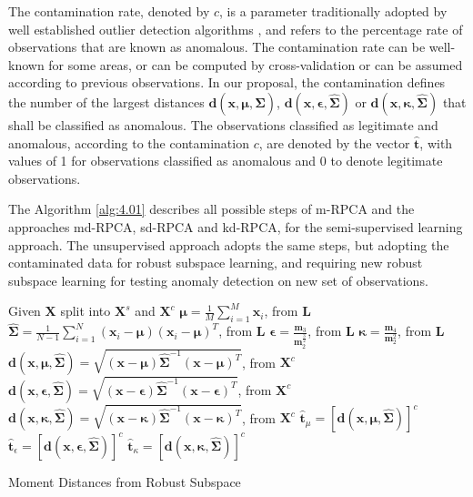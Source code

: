 The contamination rate, denoted by $c$, is a parameter traditionally adopted by well established outlier detection algorithms \cite{zhao2019pyod}, and refers to the percentage rate of observations that are known as anomalous. The contamination rate can be well-known for some areas, or can be computed by cross-validation \cite{arlot2010survey} or can be assumed according to previous observations. In our proposal, the contamination defines the number of the largest distances $\pmb{d}(\pmb{x}, \pmb{\mu}, \hat{\pmb{\Sigma}})$, $\pmb{d}(\pmb{x}, \pmb{\epsilon}, \hat{\pmb{\Sigma}})$ or $\pmb{d}(\pmb{x}, \pmb{\kappa}, \hat{\pmb{\Sigma}})$ that shall be classified as anomalous. The observations classified as legitimate and anomalous, according to the contamination $c$, are denoted by the vector $\hat{\pmb{t}}$, with values of 1 for observations classified as anomalous and 0 to denote legitimate observations.

The Algorithm \ref{alg:4.01} describes all possible steps of m-RPCA and the approaches md-RPCA, sd-RPCA and kd-RPCA, for the semi-supervised learning approach. The unsupervised approach adopts the same steps, but adopting the contaminated data for robust subspace learning, and requiring new robust subspace learning for testing anomaly detection on new set of observations.

\begin{algorithm}
	\label{alg:4.01}
	\SetAlgoLined
	Given $\pmb{X}$ split into $\pmb{X}^s$ and $\pmb{X}^c$\;
	$\pmb{\mu} = \displaystyle\frac{1}{M}\displaystyle\sum_{i = 1}^{M} \pmb{x}_i$, from $\pmb{L}$\;
	$\hat{\pmb{\Sigma}} = \displaystyle\frac{1}{N-1}\displaystyle\sum_{i = 1}^{N} (\pmb{x}_i - \pmb{\mu})(\pmb{x}_i - \pmb{\mu})^T$, \rm from $\pmb{L}$\;
	$\pmb{\epsilon} = \frac{\pmb{m}_3}{\pmb{m}_2^{\frac{3}{2}}}$, \rm from $\pmb{L}$\;
	$\pmb{\kappa} = \frac{\pmb{m}_4}{\pmb{m}_2^2}$, \rm from $\pmb{L}$\;
	$\pmb{d}(\pmb{x}, \pmb{\mu}, \hat{\pmb{\Sigma}}) = \sqrt{(\pmb{x} - \pmb{\mu}) \hat{\pmb{\Sigma}}^{-1}(\pmb{x} - \pmb{\mu})^T}$, \rm from $\pmb{X}^c$\;
	$\pmb{d}(\pmb{x}, \pmb{\epsilon}, \hat{\pmb{\Sigma}}) = \sqrt{(\pmb{x} - \pmb{\epsilon}) \hat{\pmb{\Sigma}}^{-1}(\pmb{x} - \pmb{\epsilon})^T}$, \rm from $\pmb{X}^c$\;
	$\pmb{d}(\pmb{x}, \pmb{\kappa}, \hat{\pmb{\Sigma}}) = \sqrt{(\pmb{x} - \pmb{\kappa}) \hat{\pmb{\Sigma}}^{-1}(\pmb{x} - \pmb{\kappa})^T}$, \rm from $\pmb{X}^c$\;
	$\hat{\pmb{t}}_{\mu} = [\pmb{d}(\pmb{x}, \pmb{\mu}, \hat{\pmb{\Sigma}})]^c$\;
	$\hat{\pmb{t}}_{\epsilon} = [\pmb{d}(\pmb{x}, \pmb{\epsilon}, \hat{\pmb{\Sigma}})]^c$\;
	$\hat{\pmb{t}}_{\kappa} = [\pmb{d}(\pmb{x}, \pmb{\kappa}, \hat{\pmb{\Sigma}})]^c$\;
	\caption{Moment Distances from Robust Subspace}
\end{algorithm}

